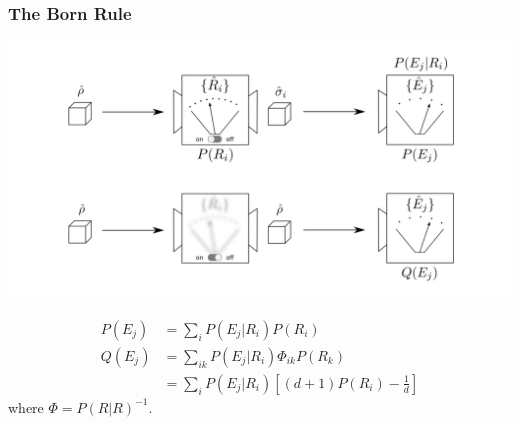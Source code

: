 \documentclass{beamer}
\begin{document}
\begin{frame}
\frametitle{The Born Rule}
\vspace{-2em}
\begin{center}
\includegraphics[scale=0.45]{img/sky_ground}	
\end{center}
\vspace{-2em}
\begin{small}
\begin{align}
P(E_j) &= \sum_i P(E_j|R_i)P(R_i)\\
Q(E_j) &= \sum_{ik} P(E_j|R_i)\Phi_{ik}P(R_k)\\
&=\sum_{i} P(E_j|R_i)\left[(d+1)P(R_i)-\frac{1}{d}\right]
\end{align}
where $\Phi = P(R|R)^{-1}$.
\end{small}
\end{frame}
\end{document}
